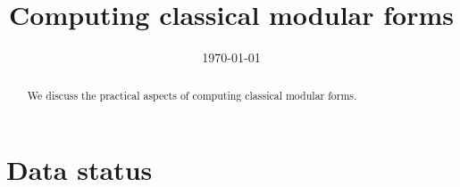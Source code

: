 \documentclass[11pt]{amsart}
\numberwithin{equation}{subsection}
\theoremstyle{definition}
\begin{document}
\title{Computing classical modular forms}
\author{}
\address{}
\email{}
\urladdr{}

\author{}
\address{}
\email{}
\urladdr{}


\date{\today}


\begin{abstract}
We discuss the practical aspects of computing classical modular forms.
\end{abstract}

\maketitle

\section{Data status}
\end{document}
